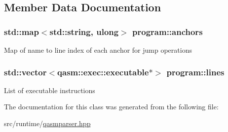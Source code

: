 \subsection{Member Data Documentation}
\subsubsection[{\texorpdfstring{anchors}{anchors}}]{\setlength{\rightskip}{0pt plus 5cm}std\+::map$<$std\+::string, {\bf ulong}$>$ program\+::anchors}\hypertarget{classprogram_ae17b7e99958aa0770b1cc4a8c20acbfe}{}\label{classprogram_ae17b7e99958aa0770b1cc4a8c20acbfe}
Map of name to line index of each anchor for jump operations 
\subsubsection[{\texorpdfstring{lines}{lines}}]{\setlength{\rightskip}{0pt plus 5cm}std\+::vector$<${\bf qasm\+::exec\+::executable}$\ast$$>$ program\+::lines}\hypertarget{classprogram_a827f0b22e21be3ce1e0e568a147488b9}{}\label{classprogram_a827f0b22e21be3ce1e0e568a147488b9}
List of executable instructions 

The documentation for this class was generated from the following file\+:\begin{DoxyCompactItemize}
\item 
src/runtime/\hyperlink{qasmparser_8hpp}{qasmparser.\+hpp}\end{DoxyCompactItemize}

